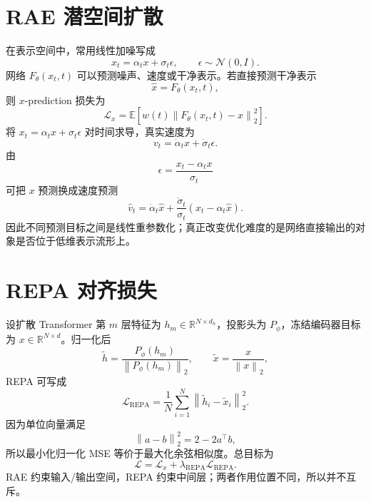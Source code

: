 \documentclass[UTF8,12pt,a4paper,fontset=none]{ctexart}
\numberwithin{equation}{section}
\newcommand{\R}{\mathbb{R}}
\newcommand{\E}{\mathbb{E}}
\newcommand{\Loss}{\mathcal{L}}
\newcommand{\norm}[1]{\left\lVert #1\right\rVert}
\begin{document}
\section{RAE 潜空间扩散}
在表示空间中，常用线性加噪写成
\begin{equation}
 x_t=\alpha_t x+\sigma_t\epsilon,
 \qquad \epsilon\sim\mathcal N(0,I).
\end{equation}
网络 $F_\theta(x_t,t)$ 可以预测噪声、速度或干净表示。若直接预测干净表示
\begin{equation}
 \widehat x=F_\theta(x_t,t),
\end{equation}
则 $x$-prediction 损失为
\begin{equation}
 \Loss_x=\E\left[w(t)\norm{F_\theta(x_t,t)-x}_2^2\right].
\end{equation}
将 $x_t=\alpha_t x+\sigma_t\epsilon$ 对时间求导，真实速度为
\begin{equation}
 v_t=\dot\alpha_t x+\dot\sigma_t\epsilon.
\end{equation}
由
\begin{equation}
 \epsilon=\frac{x_t-\alpha_t x}{\sigma_t}
\end{equation}
可把 $x$ 预测换成速度预测
\begin{equation}
 \widehat v_t
 =\dot\alpha_t\widehat x
 +\frac{\dot\sigma_t}{\sigma_t}
 (x_t-\alpha_t\widehat x).
\end{equation}
因此不同预测目标之间是线性重参数化；真正改变优化难度的是网络直接输出的对象是否位于低维表示流形上。

\section{REPA 对齐损失}
设扩散 Transformer 第 $m$ 层特征为 $h_m\in\R^{N\times d_h}$，投影头为 $P_\phi$，冻结编码器目标为 $x\in\R^{N\times d}$。归一化后
\begin{equation}
 \widetilde h=\frac{P_\phi(h_m)}{\norm{P_\phi(h_m)}_2},
 \qquad
 \widetilde x=\frac{x}{\norm{x}_2},
\end{equation}
REPA 可写成
\begin{equation}
 \Loss_{\mathrm{REPA}}
 =\frac1N\sum_{i=1}^{N}\norm{\widetilde h_i-\widetilde x_i}_2^2.
\end{equation}
因为单位向量满足
\begin{equation}
 \norm{a-b}_2^2=2-2a^\top b,
\end{equation}
所以最小化归一化 MSE 等价于最大化余弦相似度。总目标为
\begin{equation}
 \Loss=\Loss_x+\lambda_{\mathrm{REPA}}\Loss_{\mathrm{REPA}}.
\end{equation}
RAE 约束输入/输出空间，REPA 约束中间层；两者作用位置不同，所以并不互斥。
\end{document}
